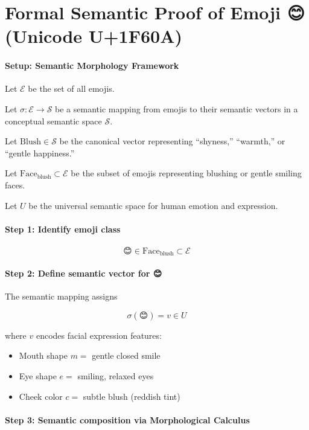 \documentclass{article}
\begin{document}
\section*{Formal Semantic Proof of Emoji 😊 (Unicode U+1F60A)}

\paragraph{Setup: Semantic Morphology Framework}

Let $\mathcal{E}$ be the set of all emojis.

Let $\sigma : \mathcal{E} \to \mathcal{S}$ be a semantic mapping from emojis to their semantic vectors in a conceptual semantic space $\mathcal{S}$.

Let $\mathrm{Blush} \in \mathcal{S}$ be the canonical vector representing ``shyness,'' ``warmth,'' or ``gentle happiness.''

Let $\mathrm{Face}_{\mathrm{blush}} \subset \mathcal{E}$ be the subset of emojis representing blushing or gentle smiling faces.

Let $U$ be the universal semantic space for human emotion and expression.

\paragraph{Step 1: Identify emoji class}

\[
\text{😊} \in \mathrm{Face}_{\mathrm{blush}} \subset \mathcal{E}
\]

\paragraph{Step 2: Define semantic vector for 😊}

The semantic mapping assigns

\[
\sigma(\text{😊}) = v \in U
\]

where $v$ encodes facial expression features:  
\begin{itemize}
    \item Mouth shape $m = $ gentle closed smile
    \item Eye shape $e = $ smiling, relaxed eyes
    \item Cheek color $c = $ subtle blush (reddish tint)
\end{itemize}

\paragraph{Step 3: Semantic composition via Morphological Calculus}
\end{document}
